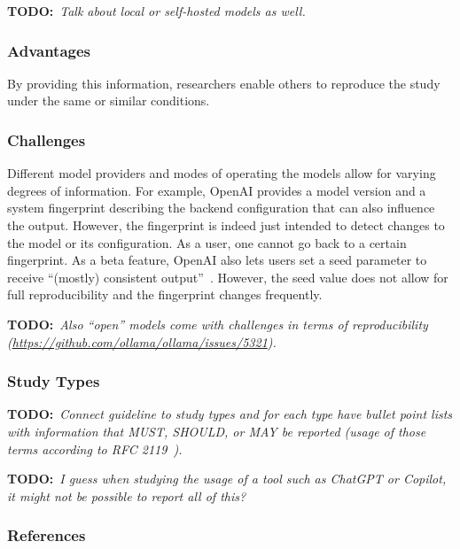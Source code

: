 \documentclass[11pt]{article}
\newcommand{\todo}[1]{{\textbf{TODO:}\ \textit{#1}}} %
\begin{document}
\todo{Talk about local or self-hosted models as well.}


\subsubsection{Advantages}

By providing this information, researchers enable others to reproduce the study under the same or similar conditions.


\subsubsection{Challenges}

Different model providers and modes of operating the models allow for varying degrees of information.
For example, OpenAI provides a model version and a system fingerprint describing the backend configuration that can also influence the output.
However, the fingerprint is indeed just intended to detect changes to the model or its configuration.
As a user, one cannot go back to a certain fingerprint.
As a beta feature, OpenAI also lets users set a seed parameter to receive ``(mostly) consistent output''~\cite{OpenAI23}.
However, the seed value does not allow for full reproducibility and the fingerprint changes frequently. 

\todo{Also ``open'' models come with challenges in terms of reproducibility (\url{https://github.com/ollama/ollama/issues/5321}).}


\subsubsection{Study Types}

\todo{Connect guideline to study types and for each type have bullet point lists with information that MUST, SHOULD, or MAY be reported (usage of those terms according to RFC 2119~\cite{rfc2119}).}

\todo{I guess when studying the usage of a tool such as ChatGPT or Copilot, it might not be possible to report all of this?}


\subsubsection{References}



\end{document}
